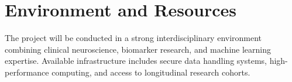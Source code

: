 \section{Environment and Resources}

The project will be conducted in a strong interdisciplinary environment
combining clinical neuroscience, biomarker research, and machine
learning expertise. Available infrastructure includes secure data
handling systems, high-performance computing, and access to
longitudinal research cohorts.
